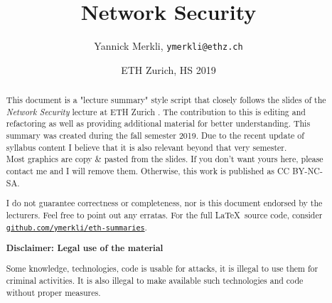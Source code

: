 \documentclass[11pt,oneside,a4paper]{article}
\title{Network Security}
\author{Yannick Merkli, \texttt{ymerkli@ethz.ch}}
\date{ETH Zurich, HS 2019}
\begin{document}
	
\begin{titlepage}
\maketitle
\vspace{3cm}
\thispagestyle{empty}


\begin{abstract}
	\noindent This document is a "lecture summary" style script that closely follows the slides of the \textit{Network Security} lecture  at ETH Zurich \cite{netsec}. The contribution to this is editing and refactoring as well as providing additional material for better understanding. This summary was created during the fall semester 2019. Due to the recent update of syllabus content I believe that it is also relevant beyond that very semester.\\
	Most graphics are copy \& pasted from the slides. If you don't want yours here, please contact me and I will remove them. Otherwise, this work is published as CC BY-NC-SA.
	
	\begin{center}
		\ccbyncsa
	\end{center}
	
	\noindent I do not guarantee correctness or completeness, nor is this document endorsed by the lecturers. Feel free to point out any erratas. For the full \LaTeX \ source code, consider \texttt{\href{https://github.com/ymerkli/eth-summaries}{github.com/ymerkli/eth-summaries}}.\\
	
	\vspace*{1cm}
	
	\centerline{\textbf{Disclaimer: Legal use of the material}}
	\vspace*{2mm}
	
	\noindent Some knowledge, technologies, code is usable for attacks, it is illegal to use them for criminal activities. It is also illegal to make available such technologies and code without proper measures.
\end{abstract}

\end{titlepage}

\maketitle
\thispagestyle{empty}
\raggedbottom
\clearpage

\end{document}
